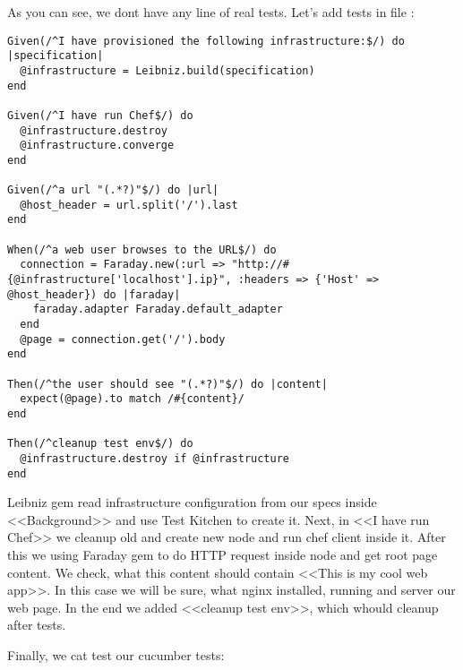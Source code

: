 As you can see, we dont have any line of real tests. Let's add tests in file :

\begin{lstlisting}[label=lst:testing-cucumber-spec6]
Given(/^I have provisioned the following infrastructure:$/) do |specification|
  @infrastructure = Leibniz.build(specification)
end

Given(/^I have run Chef$/) do
  @infrastructure.destroy
  @infrastructure.converge
end

Given(/^a url "(.*?)"$/) do |url|
  @host_header = url.split('/').last
end

When(/^a web user browses to the URL$/) do
  connection = Faraday.new(:url => "http://#{@infrastructure['localhost'].ip}", :headers => {'Host' => @host_header}) do |faraday|
    faraday.adapter Faraday.default_adapter
  end
  @page = connection.get('/').body
end

Then(/^the user should see "(.*?)"$/) do |content|
  expect(@page).to match /#{content}/
end

Then(/^cleanup test env$/) do
  @infrastructure.destroy if @infrastructure
end
\end{lstlisting}

Leibniz gem read infrastructure configuration from our specs inside <<Background>> and use Test Kitchen to create it. Next, in <<I have run Chef>> we cleanup old and create new node and run chef client inside it. After this we using Faraday gem to do HTTP request inside node and get root page content. We check, what this content should contain <<This is my cool web app>>. In this case we will be sure, what nginx installed, running and server our web page. In the end we added <<cleanup test env>>, which whould cleanup after tests.

Finally, we cat test our cucumber tests:

